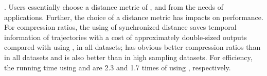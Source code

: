 . Users essentially choose a distance metric of \ped, \sed and \dad from the needs of applications. Further, the choice of a distance metric has impacts on performance.
For compression ratios, the using of synchronized distance \sed saves temporal information of trajectories with a cost of approximately double-sized outputs compared with using \ped, in all datasets; \ped has obvious better compression ratios than \dad in all datasets and \sed is also better than \dad in high sampling datasets.
For efficiency, the running time using \ped and \sed are 2.3 and 1.7 times of using \dad, respectively.



%
%
